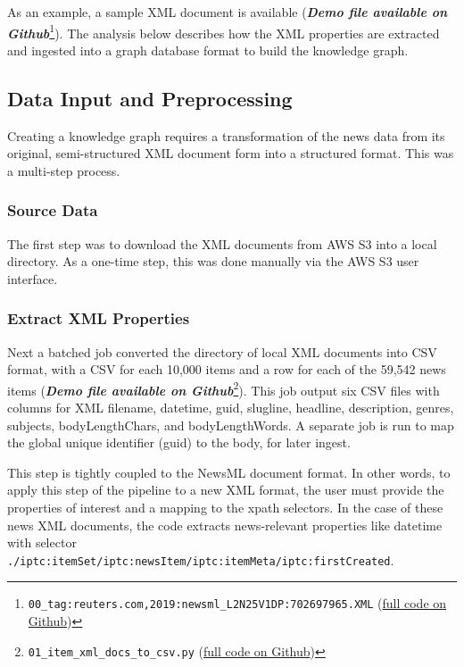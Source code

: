 \documentclass[11pt]{article}
\begin{document}
  As an example, a sample XML document is available (\textit{\textbf{Demo file available on Github}}\footnote{\lstinline{00_tag:reuters.com,2019:newsml_L2N25V1DP:702697965.XML} (\href{https://github.com/Birkbeck/msc-data-science-project-2020_21---files-heychrisek/}{full code on Github})}). The analysis below describes how the XML properties are extracted and ingested into a graph database format to build the knowledge graph.

  \subsection{Data Input and Preprocessing}
  Creating a knowledge graph requires a transformation of the news data from its original, semi-structured XML document form into a structured format. This was a multi-step process.

    \subsubsection{Source Data}
    The first step was to download the XML documents from AWS S3 into a local directory. As a one-time step, this was done manually via the AWS S3 user interface.

    \subsubsection{Extract XML Properties}

    Next a batched job converted the directory of local XML documents into CSV format, with a CSV for each 10,000 items and a row for each of the 59,542 news items (\textit{\textbf{Demo file available on Github}}\footnote{\lstinline{01_item_xml_docs_to_csv.py} (\href{https://github.com/Birkbeck/msc-data-science-project-2020_21---files-heychrisek/}{full code on Github})}). This job output six CSV files with columns for XML filename, datetime, guid, slugline, headline, description, genres, subjects, bodyLengthChars, and bodyLengthWords. A separate job is run to map the global unique identifier (guid) to the body, for later ingest.

    This step is tightly coupled to the NewsML document format. In other words, to apply this step of the pipeline to a new XML format, the user must provide the properties of interest and a mapping to the xpath selectors. In the case of these news XML documents, the code extracts news-relevant properties like datetime with selector \lstinline{./iptc:itemSet/iptc:newsItem/iptc:itemMeta/iptc:firstCreated}.
\end{document}
